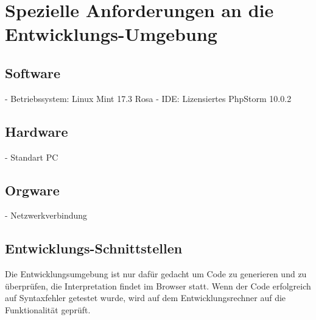 \section{Spezielle Anforderungen an die Entwicklungs-Umgebung}

    \subsection{Software}

    - Betriebssystem: Linux Mint 17.3 Rosa
    - IDE: Lizensiertes PhpStorm 10.0.2

    \subsection{Hardware}
    - Standart PC

    \subsection{Orgware}
    - Netzwerkverbindung

    \subsection{Entwicklungs-Schnittstellen}
    Die Entwicklungsumgebung ist nur dafür gedacht um Code zu generieren und zu überprüfen,
    die Interpretation findet im Browser statt. Wenn der Code erfolgreich auf Syntaxfehler
    getestet wurde, wird auf dem Entwicklungsrechner auf die Funktionalität geprüft.